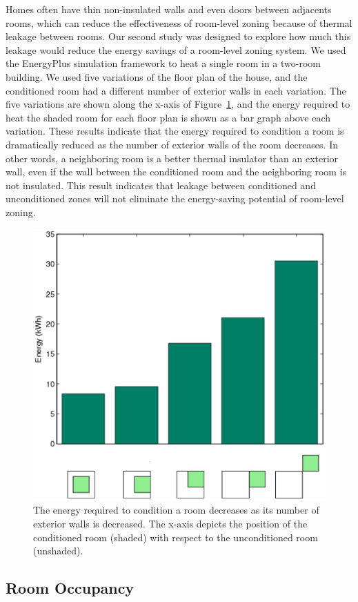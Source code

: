 Homes often have thin non-insulated walls and even doors between
adjacents rooms, which can reduce the effectiveness of room-level
zoning because of thermal leakage between rooms.  Our second study was
designed to explore how much this leakage would reduce the energy
savings of a room-level zoning system.  We used the EnergyPlus
simulation framework to heat a single room in a two-room building.  We
used five variations of the floor plan of the house, and the
conditioned room had a different number of exterior walls in each
variation.  The five variations are shown along the x-axis of
Figure~\ref{fig:wallsVsEnergyRoom}, and the energy required to heat
the shaded room for each floor plan is shown as a bar graph above each
variation.  These results indicate that the energy required to
condition a room is dramatically reduced as the number of exterior
walls of the room decreases.  In other words, a neighboring room is a
better thermal insulator than an exterior wall, even if the wall
between the conditioned room and the neighboring room is not
insulated.  This result indicates that leakage between conditioned and
unconditioned zones will not eliminate the energy-saving potential of
room-level zoning.

\begin{figure}[ht]
  \centering
  \includegraphics[width=0.55\columnwidth]{fig/wallsVsEnergyRoom}
  \caption[Effect of Exterior Walls on Energy Usage]{The energy required to
    condition a room decreases as its number of exterior walls is decreased.
    The x-axis depicts the position of the conditioned room (shaded) with
    respect to the unconditioned room (unshaded).}
  \label{fig:wallsVsEnergyRoom}
\end{figure}


\subsection{Room Occupancy}

